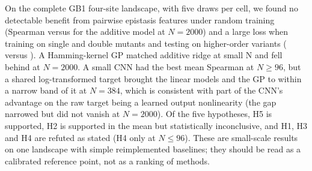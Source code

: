 On the complete GB1 four-site landscape, with five draws per cell, we found no detectable benefit from pairwise epistasis features under random training (Spearman  versus  for the additive model at $N{=}2000$) and a large loss when training on single and double mutants and testing on higher-order variants ( versus ). A Hamming-kernel GP matched additive ridge at small N and fell behind at $N{=}2000$. A small CNN had the best mean Spearman at $N\ge96$, but a shared log-transformed target brought the linear models and the GP to within a narrow band of it at $N{=}384$, which is consistent with part of the CNN's advantage on the raw target being a learned output nonlinearity (the gap narrowed but did not vanish at $N{=}2000$). Of the five hypotheses, H5 is supported, H2 is supported in the mean but statistically inconclusive, and H1, H3 and H4 are refuted as stated (H4 only at $N\le96$). These are small-scale results on one landscape with simple reimplemented baselines; they should be read as a calibrated reference point, not as a ranking of methods.
